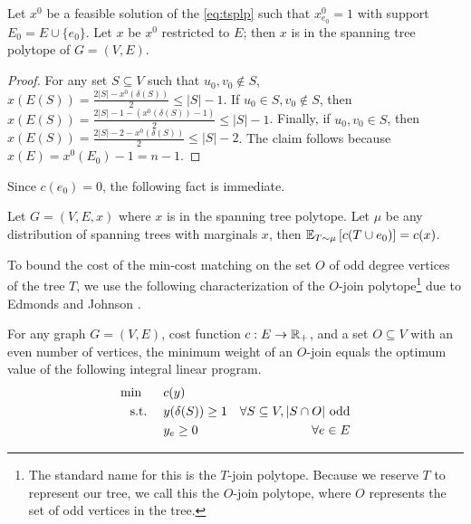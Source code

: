 \begin{fact} \label{fact:sptreepolytope}
Let $x^0$ be a feasible solution of the \ref{eq:tsplp} such that $x^0_{e_0}=1$ with support $E_0=E\cup \{e_0\}$. %
Let $x$ be $x^0$ restricted to $E$; then $x$ is in the spanning tree polytope of $G=(V,E)$. 
\end{fact}
\begin{proof}
For any set $S\subseteq V$ such that $u_0,v_0\notin S$, $x(E(S))=\frac{2|S|-x^0(\delta(S))}{2}\leq |S|-1$.
If $u_0\in S, v_0\notin S$, then
$x(E(S)) = \frac{2|S|-1 - (x^0(\delta(S)) -1 )}{2}\leq |S|-1$.
Finally, if $u_0,v_0\in S$, then 
$x(E(S)) = \frac{2|S|-2 - x^0(\delta(S))}{2} \leq |S|-2$.
The claim follows because $x(E)=x^0(E_0)-1=n-1$.
 \end{proof}


Since $c(e_0)=0$, the following fact is immediate.
\begin{fact} \label{fact:expcostT}Let $G=(V,E,x)$ where  $x$ is in the spanning tree polytope. Let $\mu$ be any distribution of spanning trees with marginals $x$, then ${\mathbb{E}}_{T\sim\mu}\left[c(T \cup e_{0})\right]=c(x)$.
 \end{fact}
 
To bound the cost of the min-cost matching on the set $O$ of odd degree vertices of the tree $T$, we use the following characterization of the $O$-join polytope\footnote{The standard name for this is the $T$-join polytope. Because we reserve $T$ to represent our tree, we call this the $O$-join polytope, where $O$ represents the set of odd vertices in the tree.} due to Edmonds and Johnson \cite{EJ73}.
\begin{proposition}
\label{prop:tjoin}
For any graph $G=(V,E)$, cost function $c: E \to \mathbb{R}_+$, and a set $O\subseteq V$ with an even number of vertices,  the minimum weight of an $O$-join equals the optimum value of the following integral linear program.
\begin{equation}
\begin{aligned}
\min \hspace{4ex} & c(y) \\
\text{s.t.} \hspace{3ex} & y(\delta(S)) \geq 1 & \forall S \subseteq V, |S\cap  O| \text{ odd}\\
& y_e \geq 0 & \forall e\in E
\end{aligned}
\label{eq:tjoinlp}
\end{equation}
\end{proposition}

